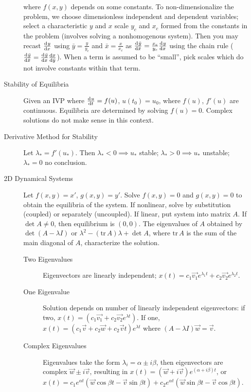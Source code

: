 \documentclass[8pt]{article}
\begin{document}
\begin{multicols}{2}
\begin{description}
    where $f(x,y)$ depends on some constants. To non-dimensionalize the problem,
    we choose dimensionless independent and dependent variables; select a
    characteristic $y$ and $x$ scale $y_c$ and $x_c$ formed from the constants
    in the problem (involves solving a nonhomogenous system). Then you may
    recast $\frac{\mathrm{d}^{} {y}}{\mathrm{d}{x}^{}}$ using $\bar{y}=\frac{y}{y_c}$ and $\bar{x}=\frac{x}{x_c}$
    as $\frac{\mathrm{d}^{} {\bar{y}}}{\mathrm{d}{\bar{x}}^{}}=\frac{x_c}{y_c}\frac{\mathrm{d}^{} {y}}{\mathrm{d}{x}^{}}$ using the chain rule
    ($\frac{\mathrm{d}^{} {\bar{y}}}{\mathrm{d}{\bar{x}}^{}}=\frac{\mathrm{d}^{} {\bar{y}}}{\mathrm{d}{x}^{}}\frac{\mathrm{d}{x}}{\mathrm{d}{\bar{y}}}$). When a
    term is assumed to be ``small'', pick scales which do not involve constants
    within that term.

  \item[Stability of Equilibria] Given an IVP where $\frac{\mathrm{d}^{} {u}}{\mathrm{d}{t}^{}}=f(u)$,
    $u(t_0)=u_0$, where $f(u)$, $f'(u)$ are continuous. Equilibria are
    determined by solving $f(u)=0$. Complex solutions do not make sense in this
    context.
  \item[Derivative Method for Stability] Let $\lambda_*=f'(u_*)$. Then
    $\lambda_*<0\implies u_*$ stable; $\lambda_*>0\implies u_*$ unstable;
    $\lambda_*=0$ no conclusion.
  \item[2D Dynamical Systems] Let $f(x,y) = x'$, $g(x,y) = y'$. Solve $f(x,y)=0$
    and $g(x,y)=0$ to obtain the equilibria of the system. If nonlinear, solve
    by substitution (coupled) or separately (uncoupled). If linear, put system
    into matrix $A$. If $\det A \ne 0$, then equilibrium is $(0,0)$. The
    eigenvalues of $A$ obtained by $\det(A-\lambda I)$ or
    $\lambda^2-(\text{tr}\,A)\lambda+\det A$, where $\text{tr}\,A$ is the sum of
    the main diagonal of $A$, characterize the solution.
    \begin{description}
    \item[Two Eigenvalues] Eigenvectors are linearly independent;
      $x(t)=c_1\vec{v_1}e^{\lambda_1 t}+c_2\vec{v_2}e^{\lambda_2 t}$.
    \item[One Eigenvalue] Solution depends on number of linearly independent
      eigenvectors: if two, $x(t)=(c_1\vec{v_1}+c_2\vec{v_2}e^{\lambda t})$. If
      one, $x(t)=(c_1\vec{v}+c_2\vec{w}+c_2\vec{v}t)e^{\lambda t}$ where
      $(A-\lambda I)\vec{w}=\vec{v}$.
    \item[Complex Eigenvalues] Eigenvalues take the form $\lambda_i = \alpha \pm
      i\beta$, then eigenvectors are complex $\vec{w}\pm i\vec{v}$, resulting in
      $x(t)=(\vec{w}+i\vec{v})e^{(\alpha+i\beta)t}$, or $x(t)=c_1e^{\alpha
        t}(\vec{w}\cos\beta t-\vec{v}\sin\beta t) + c_2e^{\alpha
        t}(\vec{w}\sin\beta t-\vec{v}\cos\beta t)$.
    \end{description}
   \end{description}
 \end{multicols}
\end{document}
